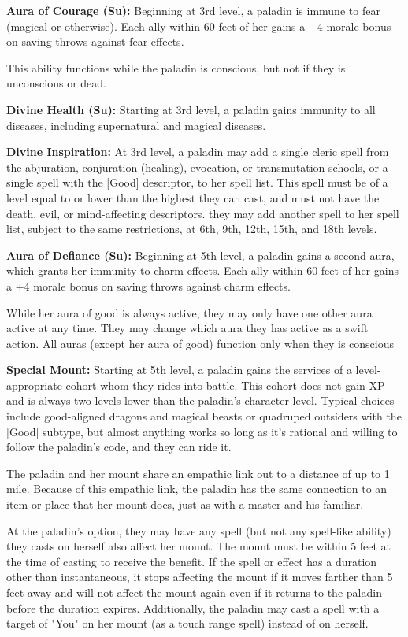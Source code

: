 \textbf{Aura of Courage (Su):} Beginning at 3rd level, a paladin is immune to fear (magical or otherwise). Each ally within 60 feet of her gains a +4 morale bonus on saving throws against fear effects.

This ability functions while the paladin is conscious, but not if they is unconscious or dead.

\textbf{Divine Health (Su):} Starting at 3rd level, a paladin gains immunity to all diseases, including supernatural and magical diseases.

\textbf{Divine Inspiration:} At 3rd level, a paladin may add a single cleric spell from the abjuration, conjuration (healing), evocation, or transmutation schools, or a single spell with the [Good] descriptor, to her spell list. This spell must be of a level equal to or lower than the highest they can cast, and must not have the death, evil, or mind-affecting descriptors. they may add another spell to her spell list, subject to the same restrictions, at 6th, 9th, 12th, 15th, and 18th levels.

\textbf{Aura of Defiance (Su):} Beginning at 5th level, a paladin gains a second aura, which grants her immunity to charm effects. Each ally within 60 feet of her gains a +4 morale bonus on saving throws against charm effects.

While her aura of good is always active, they may only have one other aura active at any time. They may change which aura they has active as a swift action. All auras (except her aura of good) function only when they is conscious

\textbf{Special Mount:} Starting at 5th level, a paladin gains the services of a level-appropriate cohort whom they rides into battle. This cohort does not gain XP and is always two levels lower than the paladin's character level. Typical choices include good-aligned dragons and magical beasts or quadruped outsiders with the [Good] subtype, but almost anything works so long as it's rational and willing to follow the paladin's code, and they can ride it.

The paladin and her mount share an empathic link out to a distance of up to 1 mile. Because of this empathic link, the paladin has the same connection to an item or place that her mount does, just as with a master and his familiar.

At the paladin's option, they may have any spell (but not any spell-like ability) they casts on herself also affect her mount. The mount must be within 5 feet at the time of casting to receive the benefit. If the spell or effect has a duration other than instantaneous, it stops affecting the mount if it moves farther than 5 feet away and will not affect the mount again even if it returns to the paladin before the duration expires. Additionally, the paladin may cast a spell with a target of "You" on her mount (as a touch range spell) instead of on herself.

